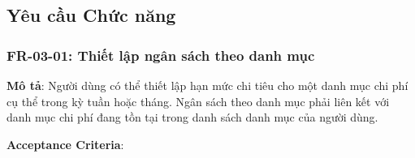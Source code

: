 \subsection{Yêu cầu Chức năng}



\subsubsection{FR-03-01: Thiết lập ngân sách theo danh mục}

\textbf{Mô tả}: Người dùng có thể thiết lập hạn mức chi tiêu cho một danh mục chi phí cụ thể trong kỳ tuần hoặc tháng. Ngân sách theo danh mục phải liên kết với danh mục chi phí đang tồn tại trong danh sách danh mục của người dùng.



\textbf{Acceptance Criteria}:

